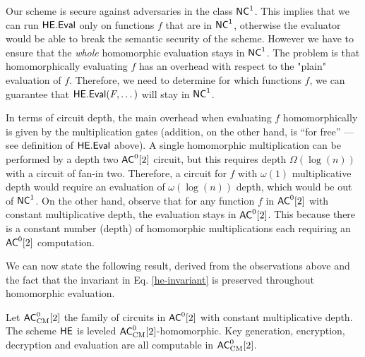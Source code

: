 Our scheme is secure against adversaries in the class ${\mathsf{NC}}^1$. This implies that we can run $\mathsf{HE.Eval}$ only on functions $f$ that are in ${\mathsf{NC}}^1$, otherwise the evaluator would be able to break the semantic security of the scheme.
However we have to ensure that the \textit{whole} homomorphic evaluation stays in ${\mathsf{NC}}^1$. The problem is that homomorphically evaluating $f$ has an overhead with respect to the "plain" evaluation of $f$. Therefore, we need to determine 
for which functions $f$, we can guarantee that 
$\mathsf{HE.Eval}(F, \dots)$ will stay in ${\mathsf{NC}}^1$. 

In terms of circuit depth, the main overhead when evaluating $f$ homomorphically is given by the multiplication gates (addition, on the other hand, is ``for free'' --- see definition of $\mathsf{HE.Eval}$ above). A single homomorphic multiplication can be performed by a depth two ${\mathsf{AC}}^0[2]$ circuit, but this requires depth $\Omega(\log(n))$ with a circuit of fan-in two. Therefore, a circuit for $f$ with $\omega(1)$ multiplicative depth would require an evaluation of $\omega(\log(n))$ depth, which would be out of ${\mathsf{NC}}^1$. On the other hand, observe that for any function $f$ in ${\mathsf{AC}}^0[2]$ with constant multiplicative depth, the evaluation stays in ${\mathsf{AC}}^0[2]$. This because there is a constant number (depth) of homomorphic multiplications each requiring an ${\mathsf{AC}}^0[2]$ computation. 

We can now state the following result, derived from the observations above and the fact that the invariant in Eq. \ref{he-invariant} is preserved throughout homomorphic evaluation.

\begin{theorem}
\label{thm:he-homomorphic}
Let ${\mathsf{AC}}^0_{\text{CM}}[2]$ the family of circuits in ${\mathsf{AC}}^0[2]$ with constant multiplicative depth.
The scheme $\mathsf{HE}$ is leveled ${\mathsf{AC}}^0_{\text{CM}}[2]$-homomorphic. Key generation, encryption, decryption and evaluation are all computable in ${\mathsf{AC}}^0_{\text{CM}}[2]$. 
\end{theorem}

